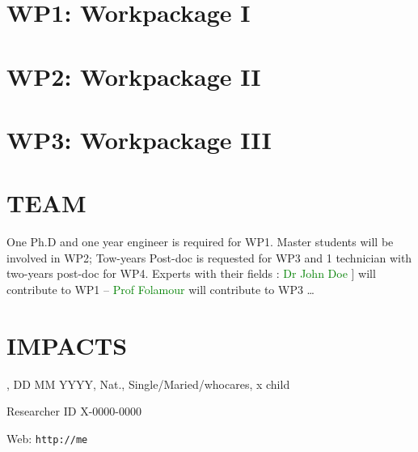 \section{WP1: Workpackage I}

\lipsum[2]


\section{WP2: Workpackage II}

\lipsum[1]

\section{WP3: Workpackage III}


\lipsum[1]




\section{TEAM}



One Ph.D and one year engineer is required for WP1. Master students will be involved in WP2; Tow-years Post-doc is requested for WP3 and 1 technician with two-years post-doc for WP4.  Experts with their fields :
\textcolor{Green}{Dr John Doe}  ] will contribute to WP1 --
\textcolor{Green}{Prof Folamour}  will contribute to WP3   \dots




\section{IMPACTS}

\lipsum[1]





\begingroup

{
\begin{multicols}{2}
\small

\end{multicols}

}
\endgroup


\clearpage
{}


\PIName, DD MM YYYY, Nat., Single/Maried/whocares, x child

Researcher ID X-0000-0000

Web: {\tt http://me} \\


